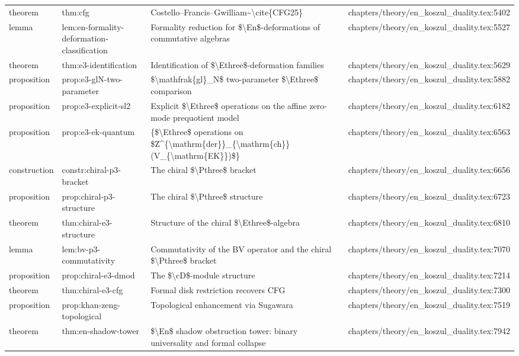 \documentclass[11pt]{article}
\begin{document}
\begin{longtable}{L{0.10\textwidth}L{0.26\textwidth}L{0.42\textwidth}L{0.22\textwidth}}
theorem & thm:cfg & Costello--Francis--Gwilliam\textasciitilde{}\textbackslash{}cite\{CFG25\} & chapters/theory/en\_koszul\_duality.tex:5402\\
lemma & lem:en-formality-deformation-classification & Formality reduction for \$\textbackslash{}En\$-deformations of commutative algebras & chapters/theory/en\_koszul\_duality.tex:5527\\
theorem & thm:e3-identification & Identification of \$\textbackslash{}Ethree\$-deformation families & chapters/theory/en\_koszul\_duality.tex:5629\\
proposition & prop:e3-glN-two-parameter & \$\textbackslash{}mathfrak\{gl\}\_N\$ two-parameter \$\textbackslash{}Ethree\$ comparison & chapters/theory/en\_koszul\_duality.tex:5882\\
proposition & prop:e3-explicit-sl2 & Explicit \$\textbackslash{}Ethree\$ operations on the affine zero-mode prequotient model & chapters/theory/en\_koszul\_duality.tex:6182\\
proposition & prop:e3-ek-quantum & \{\$\textbackslash{}Ethree\$ operations on \$Z\textasciicircum{}\{\textbackslash{}mathrm\{der\}\}\_\{\textbackslash{}mathrm\{ch\}\}(V\_\{\textbackslash{}mathrm\{EK\}\})\$\} & chapters/theory/en\_koszul\_duality.tex:6563\\
construction & constr:chiral-p3-bracket & The chiral \$\textbackslash{}Pthree\$ bracket & chapters/theory/en\_koszul\_duality.tex:6656\\
proposition & prop:chiral-p3-structure & The chiral \$\textbackslash{}Pthree\$ structure & chapters/theory/en\_koszul\_duality.tex:6723\\
theorem & thm:chiral-e3-structure & Structure of the chiral \$\textbackslash{}Ethree\$-algebra & chapters/theory/en\_koszul\_duality.tex:6810\\
lemma & lem:bv-p3-commutativity & Commutativity of the BV operator and the chiral \$\textbackslash{}Pthree\$ bracket & chapters/theory/en\_koszul\_duality.tex:7070\\
proposition & prop:chiral-e3-dmod & The \$\textbackslash{}cD\$-module structure & chapters/theory/en\_koszul\_duality.tex:7214\\
theorem & thm:chiral-e3-cfg & Formal disk restriction recovers CFG & chapters/theory/en\_koszul\_duality.tex:7300\\
proposition & prop:khan-zeng-topological & Topological enhancement via Sugawara & chapters/theory/en\_koszul\_duality.tex:7519\\
theorem & thm:en-shadow-tower & \$\textbackslash{}En\$ shadow obstruction tower: binary universality and formal collapse & chapters/theory/en\_koszul\_duality.tex:7942\\

\end{longtable}
\end{document}
